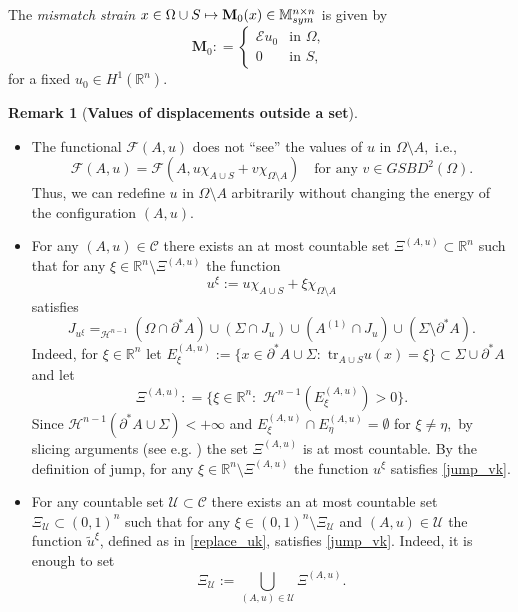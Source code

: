 \documentclass[reqno]{amsart}
\numberwithin{equation}{section}
\theoremstyle{plain}
\theoremstyle{definition}
\newtheorem{remark}[theorem]{Remark}
\newcommand{\R}{\mathbb{R}}
\newcommand{\bM}{\mathbf{M}}
\newcommand{\cH}{\mathcal{H}}
\newcommand{\cF}{\mathcal{F}}
\newcommand{\cU}{\mathcal{U}}
\newcommand{\p}{\partial}
\renewcommand{\tilde}{\widetilde}
\newcommand{\tr}{\mathrm{tr}}
\newcommand{\str}[1]{\mathcal{E}#1}
\newcommand{\mtwo}{\mathbb{M}^{n\times n}_{\rm sym}}
\newcommand{\admissible}{\mathcal{C}}
\newcommand{\substrate}{S}
\begin{document}
%
The {\it mismatch strain}  $x\in\Omega\cup\substrate\mapsto \bM_0(x)\in\mtwo$ is given by  
$$
\bM_0: = 
\begin{cases}
\str{u_0} & \text{in $\Omega ,$}\\
0 &  \text{in $\substrate,$}
\end{cases}
$$ 
for a fixed $u_0\in H^1(\R^n)$. 

\begin{remark}[\textbf{Values of displacements outside a set}]\label{rem:ext_u_out_A}
$\,$
\begin{itemize}[left = 7pt]
\item[(i)] The functional $\cF(A,u)$ does not ``see'' the values of $u$ in $\Omega\setminus A,$ i.e., 
$$
\cF(A,u) = \cF(A,u\chi_{A\cup S}+v\chi_{\Omega\setminus A})\quad \text{for any $v\in GSBD^2(\Omega).$}
$$
Thus, we can redefine $u$ in $\Omega\setminus A$ arbitrarily without changing the energy of the configuration $(A,u)$.

\item[(ii)] For any $(A,u)\in\admissible$ there exists an at most countable set $\Xi^{(A,u)}\subset \R^n$  such that for any $\xi\in\R^n\setminus \Xi^{(A,u)}$ the function 
\begin{equation}\label{replace_uk}
u^\xi:=u\chi_{A\cup S} + \xi\chi_{\Omega\setminus A} 
\end{equation}
satisfies 
%
\begin{equation}\label{jump_vk}
J_{u^\xi} =_{\cH^{n-1}} (\Omega\cap\p^*A)\cup (\Sigma\cap J_u)\cup (A^{(1)}\cap J_u)\cup (\Sigma\setminus \p^*A).
\end{equation}
%
Indeed, for $\xi\in\R^n$ let 
$
E_\xi^{(A,u)}:=\{x\in \p^*A\cup \Sigma:\,\, \tr_{A\cup S}^{}u(x) =\xi\} \subset \Sigma\cup \p^*A
$
and let
$$
\Xi^{(A,u)}: = \{\xi\in\R^n:\,\,\cH^{n-1}(E_\xi^{(A,u)})>0\}.
$$
Since $\cH^{n-1}(\p^*A\cup \Sigma)<+\infty$ and $E_\xi^{(A,u)}\cap E_\eta^{(A,u)}=\emptyset$ for $\xi\ne\eta,$  by slicing arguments (see e.g. \cite[Proposition A.2]{HP:2021_arxiv}) the set $\Xi^{(A,u)}$ is at most countable. By the definition of jump, for any $\xi\in\R^n\setminus \Xi^{(A,u)}$ the function $u^\xi$ satisfies \eqref{jump_vk}.

\item[(iii)] For any countable set $\cU\subset\admissible$ there exists an at most countable set $\Xi_{\cU}\subset (0,1)^n$ such that for any $\xi\in(0,1)^n\setminus \Xi_\cU$ and $(A,u)\in \mathcal{U}$ the function $\tilde u^\xi$, defined as in \eqref{replace_uk}, 
satisfies 
\eqref{jump_vk}.  Indeed, it is enough to set
$$
\Xi_\cU:=\bigcup_{(A,u)\in\cU}\Xi^{(A,u)}.
$$ 
\end{itemize}

\end{remark}
\end{document}
